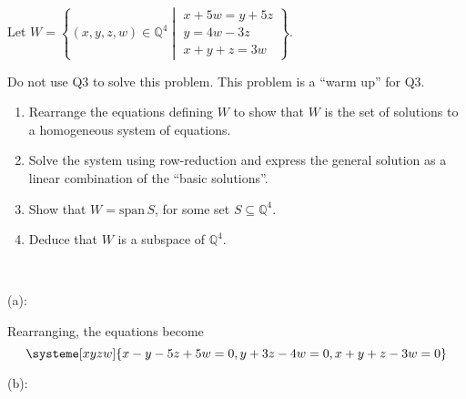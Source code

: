 \documentclass{article}
\theoremstyle{plain} %
\numberwithin{thm}{section} %
\theoremstyle{definition}
\begin{document}
    \newpage
    \begin{question}{2}
        Let \( W = \left\{ (x,y,z,w) \in \mathbb{Q}^4 \middle| \begin{array}{l}
        x + 5w = y + 5z \\
        y = 4w - 3z \\
        x + y + z = 3w
        \end{array} \right\} \).
        
        Do not use Q3 to solve this problem. This problem is a “warm up” for Q3.
        
        \begin{enumerate}[label=(\alph*)]
            \item Rearrange the equations defining \( W \) to show that \( W \) is the set of solutions to a homogeneous system of equations.
            \item Solve the system using row-reduction and express the general solution as a linear combination of the “basic solutions”.
            \item Show that \( W = \text{span} \, S \), for some set \( S \subseteq \mathbb{Q}^4 \).
            \item Deduce that \( W \) is a subspace of \( \mathbb{Q}^4 \).
        \end{enumerate}

        \tcblower
        \ 

        (a):

        Rearranging, the equations become
        \begin{equation*}
            \systeme[xyzw]{
                x - y - 5z + 5w = 0,
                y + 3z -4w = 0,
                x + y + z -3w = 0
            }
        \end{equation*}

        \medskip

        (b):


\end{question}
\end{document}
